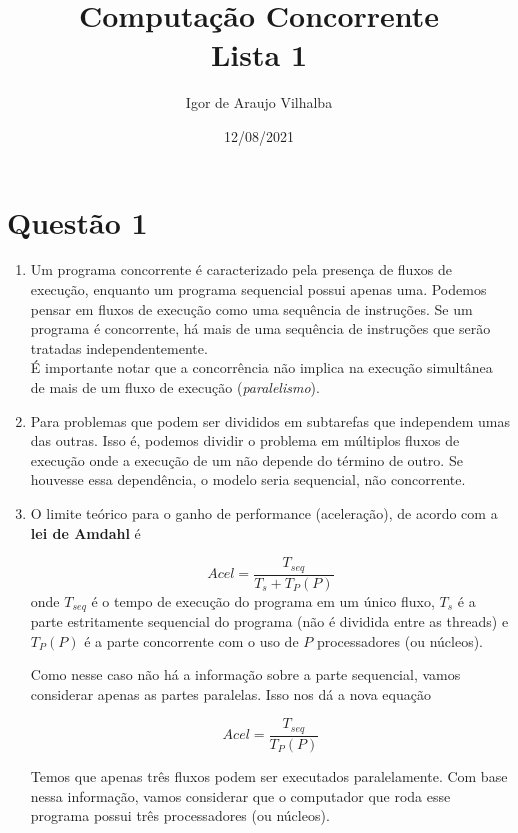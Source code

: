 \documentclass{article}
\title{\Large \textbf{Computação Concorrente}
	\vspace{0.5em}\\
	\large Lista 1
}
\author{Igor de Araujo Vilhalba}
\date{12/08/2021}
\begin{document}
\maketitle

\section*{Questão 1}

\begin{enumerate}[label=\textbf{\alph*)}]
	\item Um programa concorrente é caracterizado pela presença de fluxos de execução,
		enquanto um programa sequencial possui apenas uma. Podemos pensar em fluxos
		de execução como uma sequência de instruções. Se um programa é concorrente,
		há mais de uma sequência de instruções que serão tratadas independentemente.\\
		É importante notar que a concorrência não implica na execução simultânea de
		mais de um fluxo de execução (\emph{paralelismo}).
	\item Para problemas que podem ser divididos em subtarefas que independem umas das
		outras. Isso é, podemos dividir o problema em múltiplos fluxos de execução
		onde a execução de um não depende do término de outro. Se houvesse essa
		dependência, o modelo seria sequencial, não concorrente.
	\item O limite teórico para o ganho de performance (aceleração), de acordo com
		a \textbf{lei de Amdahl} é
		\begin{center}
			$$
			Acel = \frac{T_{seq}}{T_s+T_P(P)}
			$$
			onde $T_{seq}$ é o tempo de execução do programa em um único fluxo,
			$T_s$ é a parte estritamente sequencial do programa (não é dividida
			entre as threads) e $T_P(P)$ é a parte concorrente com o uso de $P$
			processadores (ou núcleos).
		\end{center}
		Como nesse caso não há a informação sobre a parte sequencial, vamos considerar apenas
		as partes paralelas. Isso nos dá a nova equação
		\begin{center}
			$$
			Acel = \frac{T_{seq}}{T_P(P)}
			$$
		\end{center}
		Temos que apenas três fluxos podem ser executados paralelamente. Com base nessa informação,
		vamos considerar que o computador que roda esse programa possui três processadores (ou núcleos).\\


\end{enumerate}
\end{document}
